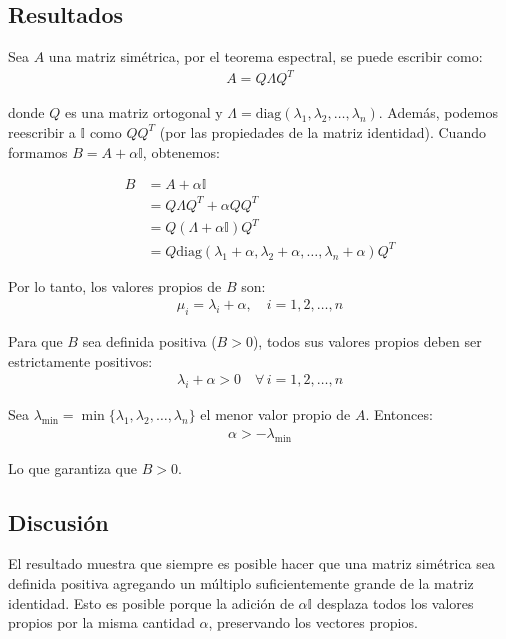 \documentclass{article}
\begin{document}
\subsection{Resultados}
\setcounter{equation}{0}

Sea $A$ una matriz simétrica, por el teorema espectral, se puede escribir como:
\begin{align}
A = Q \Lambda Q^T
\end{align}

donde $Q$ es una matriz ortogonal y $\Lambda = \text{diag}(\lambda_1, \lambda_2, \ldots, \lambda_n)$. Además, podemos reescribir a $\mathbb{I}$ como $QQ^T$ (por las propiedades de la matriz identidad). Cuando formamos $B = A + \alpha \mathbb{I}$, obtenemos:

\begin{align}
B &= A + \alpha \mathbb{I} \\
&= Q \Lambda Q^T + \alpha QQ^T \\
&= Q(\Lambda + \alpha \mathbb{I})Q^T \\
&= Q \text{diag}(\lambda_1 + \alpha, \lambda_2 + \alpha, \ldots, \lambda_n + \alpha) Q^T
\end{align}

Por lo tanto, los valores propios de $B$ son:
\begin{align}
\mu_i = \lambda_i + \alpha, \quad i = 1, 2, \ldots, n
\end{align}

Para que $B$ sea definida positiva ($B > 0$), todos sus valores propios deben ser estrictamente positivos:
\begin{align}
\lambda_i + \alpha > 0 \quad \forall \, i = 1, 2, \ldots, n
\end{align}

Sea $\lambda_{\min} = \min\{\lambda_1, \lambda_2, \ldots, \lambda_n\}$ el menor valor propio de $A$. Entonces:
\begin{align}
\alpha > -\lambda_{\min}
\end{align}

Lo que garantiza que $B > 0$.

\subsection{Discusión}

El resultado muestra que siempre es posible hacer que una matriz simétrica sea definida positiva agregando un múltiplo suficientemente grande de la matriz identidad. Esto es posible porque la adición de $\alpha \mathbb{I}$ desplaza todos los valores propios por la misma cantidad $\alpha$, preservando los vectores propios.
\end{document}
